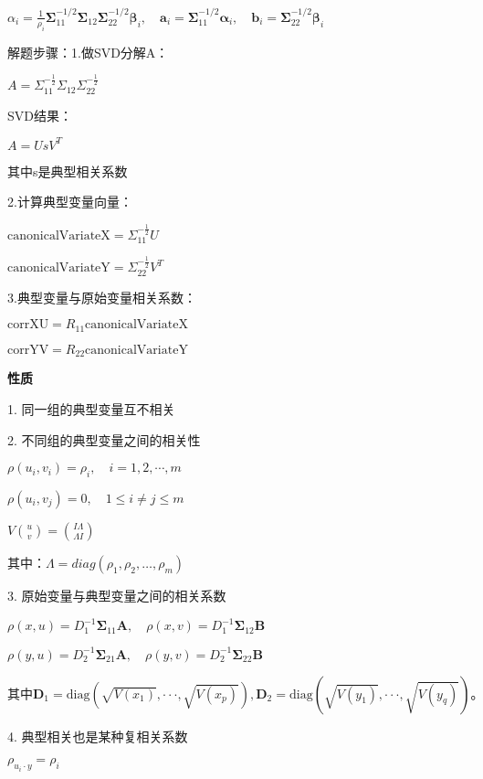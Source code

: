 \documentclass[10pt,a4paper]{ctexart} %
\begin{document}
\begin{multicols*}{3}
		$\alpha_{i}=\frac{1}{\rho_{i}}\boldsymbol{\Sigma}_{11}^{-1/2}\boldsymbol{\Sigma}_{12}\boldsymbol{\Sigma}_{22}^{-1/2}\boldsymbol{\beta}_{i},\quad\boldsymbol{a}_{i}=\boldsymbol{\Sigma}_{11}^{-1/2}\boldsymbol{\alpha}_{i},\quad\boldsymbol{b}_{i}=\boldsymbol{\Sigma}_{22}^{-1/2}\boldsymbol{\beta}_{i}$
		
		解题步骤：1.做SVD分解A：
		
		$A=\Sigma_{11}^{-\frac{1}{2}}\Sigma_{12}\Sigma_{22}^{-\frac{1}{2}}$
		
		SVD结果：
		
		$A=UsV^T$
		
		其中s是典型相关系数
		
		2.计算典型变量向量：
		
		$\text{canonicalVariateX} = \Sigma_{11}^{-\frac{1}{2}}U$
		
		$\text{canonicalVariateY} = \Sigma_{22}^{-\frac{1}{2}}V^T$
		
		3.典型变量与原始变量相关系数：
		
		$\text{corrXU} = R_{11} \text{canonicalVariateX}$
		
		$\text{corrYV} = R_{22} \text{canonicalVariateY}$
		
		\textbf{性质}
		
		1. 同一组的典型变量互不相关
		
		2. 不同组的典型变量之间的相关性
		
		$\rho(u_{i},v_{i})=\rho_{i},\quad i=1,2,\cdots,m$
		
		$\rho(u_{i},v_{j})=0,\quad1\leqslant i\neq j\leqslant m$
		
		$V\binom{u}{v}=\binom{I \Lambda}{\Lambda I}$
		
		其中：$\Lambda = diag(\rho_1,\rho_2,\dots,\rho_m)$
		
		3. 原始变量与典型变量之间的相关系数
		
		$\rho(x,u)=D_1^{-1}\boldsymbol{\Sigma}_{11}\boldsymbol{A},\quad\rho(x,v)=D_1^{-1}\boldsymbol{\Sigma}_{12}\boldsymbol{B}$
		
		$\rho(y,u)=D_2^{-1}\boldsymbol{\Sigma}_{21}\boldsymbol{A},\quad\rho(y,v)=D_2^{-1}\boldsymbol{\Sigma}_{22}\boldsymbol{B}$
		
		$\text{其中}\mathbf{D}_1=\mathrm{diag}(\sqrt{V(x_1)},\cdotp\cdotp\cdotp,\sqrt{V(x_p)}),\mathbf{D}_2=\mathrm{diag}(\sqrt{V(y_1)},\cdotp\cdotp\cdotp,\sqrt{V(y_q)})。$
		
		4. 典型相关也是某种复相关系数
		
		$\rho_{u_i \cdot y}=\rho_i$
		

\end{multicols*}
\end{document}
